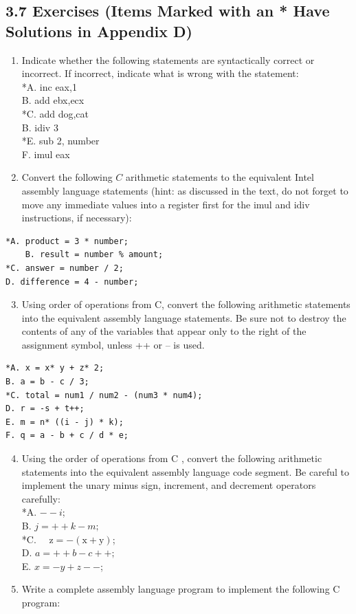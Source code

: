 \documentclass[10pt]{article}
\begin{document}
\subsection*{3.7 Exercises (Items Marked with an * Have Solutions in Appendix D)}
\begin{enumerate}
  \item Indicate whether the following statements are syntactically correct or incorrect. If incorrect, indicate what is wrong with the statement:\\
*A. inc eax,1\\
B. add ebx,ecx\\
*C. add dog,cat\\
B. idiv 3\\
*E. sub 2, number\\
F. imul eax
  \item Convert the following $C$ arithmetic statements to the equivalent Intel assembly language statements (hint: as discussed in the text, do not forget to move any immediate values into a register first for the imul and idiv instructions, if necessary):
\end{enumerate}

\begin{verbatim}
*A. product = 3 * number;
    B. result = number % amount;
*C. answer = number / 2;
D. difference = 4 - number;
\end{verbatim}

\begin{enumerate}
  \setcounter{enumi}{2}
  \item Using order of operations from C, convert the following arithmetic statements into the equivalent assembly language statements. Be sure not to destroy the contents of any of the variables that appear only to the right of the assignment symbol, unless ++ or -- is used.
\end{enumerate}

\begin{verbatim}
*A. x = x* y + z* 2;
B. a = b - c / 3;
*C. total = num1 / num2 - (num3 * num4);
D. r = -s + t++;
E. m = n* ((i - j) * k);
F. q = a - b + c / d * e;
\end{verbatim}

\begin{enumerate}
  \setcounter{enumi}{3}
  \item Using the order of operations from C , convert the following arithmetic statements into the equivalent assembly language code segment. Be careful to implement the unary minus sign, increment, and decrement operators carefully:\\
*A. $--i$;\\
B. $j=++k-m ;$\\
*C. $\quad \mathrm{z}=-(\mathrm{x}+\mathrm{y})$;\\
D. $a=++b-c++;$\\
E. $x=-y+z--$;
  \item Write a complete assembly language program to implement the following C program:
\end{enumerate}
\end{document}
